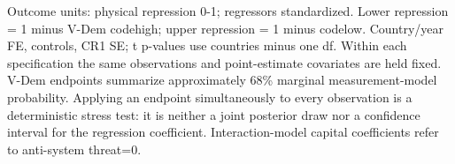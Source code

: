 \begin{table}[htbp]\centering
\caption{H2. Physical-repression endpoint sensitivity}
\label{tab:measurement_vdem}
\small
{}
\begin{tablenotes}\footnotesize Outcome units: physical repression 0-1; regressors standardized. Lower repression = 1 minus V-Dem codehigh; upper repression = 1 minus codelow. Country/year FE, controls, CR1 SE; t p-values use countries minus one df. Within each specification the same observations and point-estimate covariates are held fixed. V-Dem endpoints summarize approximately 68\% marginal measurement-model probability. Applying an endpoint simultaneously to every observation is a deterministic stress test: it is neither a joint posterior draw nor a confidence interval for the regression coefficient. Interaction-model capital coefficients refer to anti-system threat=0.\end{tablenotes}
\end{table}